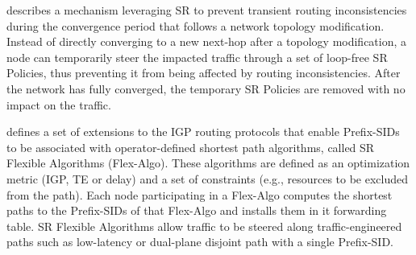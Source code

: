 \cite{id-segment-routing-uloop} describes a mechanism leveraging SR to prevent transient routing inconsistencies during the convergence period that follows a network topology modification. Instead of directly converging to a new next-hop after a topology modification, a node can temporarily steer the impacted traffic through a set of loop-free SR Policies, thus preventing it from being affected by routing inconsistencies. After the network has fully converged, the temporary SR Policies are removed with no impact on the traffic.

\cite{ietf-lsr-flex-algo-00} defines a set of extensions to the IGP routing protocols that enable Prefix-SIDs to be associated with operator-defined shortest path algorithms, called SR Flexible Algorithms (Flex-Algo). These algorithms are defined as an optimization metric (IGP, TE or delay) and a set of constraints (e.g., resources to be excluded from the path). Each node participating in a Flex-Algo computes the shortest paths to the Prefix-SIDs of that Flex-Algo and installs them in it forwarding table. SR Flexible Algorithms allow traffic to be steered along traffic-engineered paths such as low-latency or dual-plane disjoint path with a single Prefix-SID.


